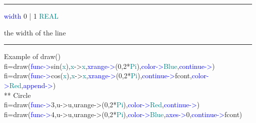 \vspace{0.3cm} 
\hrule 
\vspace{0.3cm} 
\noindent \textcolor{blue}{width}  \tabto{3cm}  0 | 1  \tabto{5cm}   \textcolor{teal}{REAL}  \tabto{7cm} 
\begin{changemargin}{3cm}{0cm} 
\noindent  the width of the line 
\end {changemargin} 
\hrule 
\vspace{0.2cm} 
\singlespacing 
\begin{example}[drawex]Example of \textcolor{VioletRed}{draw}()\\ 
\label{drawex} 
\noindent fi=\textcolor{VioletRed}{draw}(\textcolor{blue}{func->}\textcolor{VioletRed}{sin}(\textcolor{teal}{x}),\textcolor{teal}{x}->\textcolor{teal}{x},\textcolor{blue}{xrange->}(0,2*\textcolor{teal}{Pi}),\textcolor{blue}{color->}\textcolor{teal}{Blue},\textcolor{blue}{continue->})\\ 
fi=\textcolor{VioletRed}{draw}(\textcolor{blue}{func->}\textcolor{VioletRed}{cos}(\textcolor{teal}{x}),\textcolor{teal}{x}->\textcolor{teal}{x},\textcolor{blue}{xrange->}(0,2*\textcolor{teal}{Pi}),\textcolor{blue}{continue->}fcont,\textcolor{blue}{color->}\textcolor{teal}{Red},\textcolor{blue}{append->})\\ 
{\color{ForestGreen}** Circle}\\ 
fi=\textcolor{VioletRed}{draw}(\textcolor{blue}{func->}3,u->u,urange->(0,2*\textcolor{teal}{Pi}),\textcolor{blue}{color->}\textcolor{teal}{Red},\textcolor{blue}{continue->})\\ 
fi=\textcolor{VioletRed}{draw}(\textcolor{blue}{func->}4,u->u,urange->(0,2*\textcolor{teal}{Pi}),\textcolor{blue}{color->}\textcolor{teal}{Blue},\textcolor{blue}{axes->}0,\textcolor{blue}{continue->}fcont)\\ 
 

\end{example}
